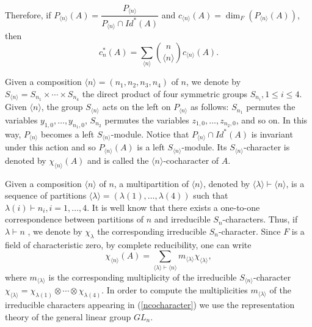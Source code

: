 \documentclass[10pt,a4paper]{amsart}
\begin{document}
	Therefore, if $P_{\langle n\rangle}(A)=\dfrac{P_{\langle n\rangle}}{P_{\langle n\rangle}\cap Id^*(A)}$ and $c_{\langle n\rangle}(A)=\dim_F(P_{\langle n\rangle}(A))$, then \begin{equation}\label{codim}
		c_n^*(A)=\displaystyle \sum_{\langle n\rangle}\binom{n}{{\langle n\rangle}}c_{\langle n\rangle}(A).
	\end{equation}
	
	Given a composition $\langle n\rangle=(n_1,n_2,n_3,n_4)$ of $n$, we denote by $S_{\langle n \rangle}=S_{n_1}\times \cdots \times S_{n_4}$ the direct product of four symmetric groups $S_{n_i},1\leq i\leq 4$. Given $\langle n \rangle$, the group $S_{\langle n \rangle}$ acts on the left on $P_{\langle n \rangle}$ as follows: $S_{n_1}$ permutes the variables $y_{1,0}, \ldots, y_{n_1,0}$, $S_{n_2}$ permutes the variables $z_{1,0},\ldots, z_{n_2,0}$, and so on. In this way, $P_{\langle n \rangle}$ becomes a left $S_{\langle n \rangle}$-module. Notice that $P_{\langle n\rangle}\cap Id^*(A)$ is invariant under this action and so $P_{\langle n\rangle}(A)$ is a left $S_{\langle n\rangle}$-module. Its $S_{\langle n\rangle}$-character is denoted by $\chi_{\langle n\rangle}(A)$ and is called the $\langle n\rangle$-cocharacter of $A$.

	Given a composition $\langle n\rangle$ of $n$, a multipartition of $\langle n\rangle$, denoted by $\langle \lambda \rangle\vdash \langle n\rangle$, is a sequence of partitions $\langle \lambda\rangle=(\lambda(1),\ldots, \lambda(4))$ such that $\lambda(i)\vdash n_i,i=1,\ldots, 4$. It is well know that there exists a one-to-one correspondence between partitions of $n$ and irreducible $S_n$-characters. Thus, if $\lambda\vdash n$ , we denote by $\chi_{\lambda}$ the corresponding irreducible $S_n$-character.
	Since $F$ is a field of characteristic zero, by complete reducibility, one can write \begin{equation}\label{ncocharacter}
		\chi_{\langle n\rangle}(A)=\displaystyle \sum_{\langle \lambda \rangle\vdash \langle n\rangle} m_{\langle \lambda \rangle}\chi_{\langle \lambda \rangle},
	\end{equation} where $m_{\langle \lambda \rangle}$ is the corresponding multiplicity of the irreducible $S_{\langle n \rangle}$-character $\chi_{\langle \lambda \rangle}=\chi_{\lambda(1)}\otimes \cdots \otimes \chi_{\lambda(4)}$. In order to compute the multiplicities $m_{\langle \lambda \rangle}$ of the
	irreducible characters appearing in (\ref{ncocharacter}) we use the
	re\-presentation theory of the general linear group $GL_n$.
\end{document}
